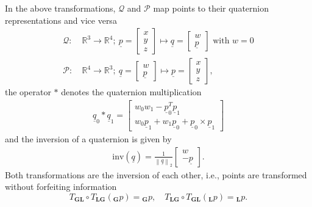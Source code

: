 In the above transformations,
$\mathcal{Q}$ and $\mathcal{P}$ 
map points to their quaternion representations and vice versa
\begin{align}
    \mathcal{Q}
    :\ 
    &\mathbb{R}^3 \rightarrow \mathbb{R}^4
    ;\
    \underline p 
    =
    \begin{bmatrix}
        x \\ y \\ z 
    \end{bmatrix} 
    \mapsto
    \underline q
    = 
    \begin{bmatrix}
        w \\ \underline p
    \end{bmatrix} 
    \text{ with }
    w = 0
    \nonumber \\
    \mathcal{P}
    :\ 
    &\mathbb{R}^4 \rightarrow \mathbb{R}^3
    ;\
    \underline q
    = 
    \begin{bmatrix}
        w \\ \underline p
    \end{bmatrix} 
    \mapsto
    \underline p 
    =
    \begin{bmatrix}
        x \\ y \\ z 
    \end{bmatrix}, 
\end{align}
the operator $*$ denotes the quaternion multiplication
\begin{align}
    \underline q_0 * \underline q_1 
    = 
    \begin{bmatrix}
        w_0 w_1 - \underline p_0^T \underline p_1\\ 
        w_0 \underline p_1 + w_1 \underline p_0 + \underline p_0 \times \underline p_1
    \end{bmatrix}
\end{align}
and the inversion of a quaternion is given by
\begin{align}
    \mathrm{inv}(\underline q) 
    = 
    \frac
    {1}
    {\left\| \underline q \right\|_2}
    \begin{bmatrix}
        w\\ 
        -\underline p
    \end{bmatrix}
    .
\end{align}
Both transformations are the inversion of each other,
i.e.,
points are transformed without forfeiting information
\begin{equation}
    T_\textbf{GL} 
    \circ 
    T_\textbf{LG} \left(
        {}_\textbf{G} p
    \right)
    =
    {}_\textbf{G} p
    ,\quad
    T_\textbf{LG} 
    \circ 
    T_\textbf{GL} \left(
        {}_\textbf{L} p
    \right)
    =
    {}_\textbf{L} p
    .
\end{equation}



